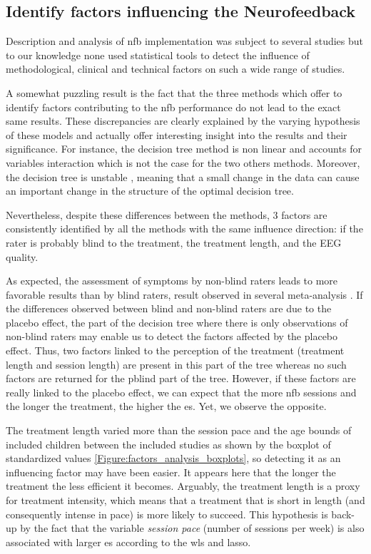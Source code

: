 
\subsection{Identify factors influencing the Neurofeedback}

Description and analysis of \gls{nfb} implementation was subject to several studies \citep{Arns2014, Enriquez2017, Vernon2004, Jeunet2018} 
but to our knowledge none used statistical tools to detect the influence of methodological, clinical and technical factors 
on such a wide range of studies. 

A somewhat puzzling result is the fact that the three methods which offer to identify factors contributing to the \gls{nfb} 
performance do not lead to the exact same results. These discrepancies are clearly explained by the varying hypothesis 
of these models and actually offer interesting insight into the results and their significance. For instance, the decision tree method is non 
linear and accounts for variables interaction which is not the case for the two others methods. Moreover, the decision tree is unstable 
\citep{dwyer2007}, meaning that a small change in the data can cause an important change in the structure of the optimal decision tree.

Nevertheless, despite these differences between the methods, 3 factors are consistently identified by all the methods with 
the same influence direction: if the rater is probably blind to the treatment, the treatment length, and the EEG quality. 

As expected, the assessment of symptoms by non-blind raters leads to more favorable results than by blind raters, 
result observed in several meta-analysis  \citep{Cortese2016, Micoulaud2014}. If the differences observed between blind 
and non-blind raters are due to the placebo effect, the part of the decision tree where there is only observations of 
non-blind raters may enable us to detect the factors affected by the placebo effect. 
Thus, two factors linked to the perception of the treatment (treatment length and session length)
are present in this part of the tree whereas no such factors are returned for 
the \gls{pblind} part of the tree. However, if these factors are really linked to the placebo effect, we can expect that
the more \gls{nfb} sessions and the longer the treatment, the higher the \gls{es}. Yet, we observe the opposite.

The treatment length varied more than the session pace and the age bounds of included children between the included studies as shown 
by the boxplot of standardized values \cref{Figure:factors_analysis_boxplots}, so detecting it as an influencing factor may have 
been easier. It appears here that the longer the treatment the less efficient it becomes. Arguably, the treatment length is a proxy 
for treatment intensity, which means that a treatment that is short in length (and consequently intense in pace) 
is more likely to succeed. This hypothesis is back-up by the fact that the variable \emph{session pace} (number of sessions per week) 
is also associated with larger \gls{es} according to the \gls{wls} and \gls{lasso}. 


